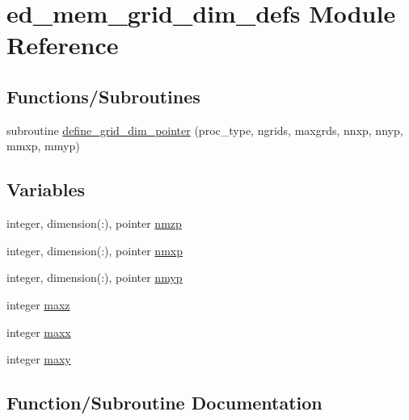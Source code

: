 \hypertarget{namespaceed__mem__grid__dim__defs}{}\section{ed\+\_\+mem\+\_\+grid\+\_\+dim\+\_\+defs Module Reference}
\label{namespaceed__mem__grid__dim__defs}
\subsection*{Functions/\+Subroutines}
\begin{DoxyCompactItemize}
\item 
subroutine \hyperlink{namespaceed__mem__grid__dim__defs_ad239d701d9000451504dc71a6a3b538a}{define\+\_\+grid\+\_\+dim\+\_\+pointer} (proc\+\_\+type, ngrids, maxgrds,                               nnxp, nnyp, mmxp, mmyp)
\end{DoxyCompactItemize}
\subsection*{Variables}
\begin{DoxyCompactItemize}
\item 
integer, dimension(\+:), pointer \hyperlink{namespaceed__mem__grid__dim__defs_a1922a1169c2a61922996eb3cb1571231}{nmzp}
\item 
integer, dimension(\+:), pointer \hyperlink{namespaceed__mem__grid__dim__defs_a57ab8eb1467e9e968a109f132aef7382}{nmxp}
\item 
integer, dimension(\+:), pointer \hyperlink{namespaceed__mem__grid__dim__defs_a05d50362fba68ca90db983160e8a5213}{nmyp}
\item 
integer \hyperlink{namespaceed__mem__grid__dim__defs_aff75646038b2a6839b9d2a9faa7672d8}{maxz}
\item 
integer \hyperlink{namespaceed__mem__grid__dim__defs_a53ce5ed3feaad0ea89bb77b8fc3fa220}{maxx}
\item 
integer \hyperlink{namespaceed__mem__grid__dim__defs_a83f50efdee1a0d683634a441b608b988}{maxy}
\end{DoxyCompactItemize}


\subsection{Function/\+Subroutine Documentation}
\hypertarget{namespaceed__mem__grid__dim__defs_ad239d701d9000451504dc71a6a3b538a}{}
